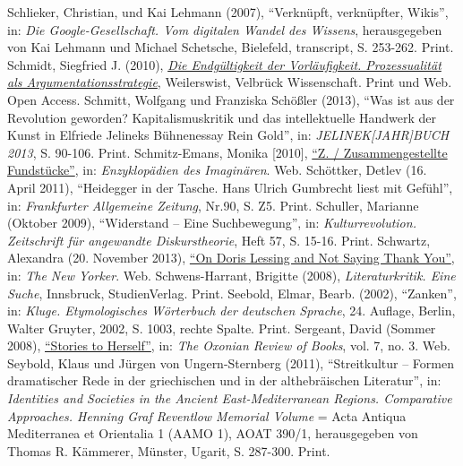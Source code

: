 \documentclass[fontsize=12pt]{scrartcl}
\begin{document}
{{{{\begin{thebibliography}
	Schlieker, Christian, und Kai Lehmann (2007), "`Verkn\"upft, verkn\"upfter, Wikis"', in: \textit{Die Google-Ge\-sell\-schaft. Vom digitalen Wandel des Wissens}, he\-rausgegeben von Kai Lehmann und Michael Schetsche, Bielefeld, transcript, S. 253-262. Print.
	Schmidt, Siegfried J. (2010), \href{http://edocs.fu-berlin.de/docs/receive/FUDOCS_document_000000010457}{\textit{Die Endg\"ultigkeit der Vorl\"aufigkeit. Prozessualit\"at als Argumentationsstrategie}}, Weilerswist, Velbr\"uck Wissenschaft. Print und Web. Open Access.
	Schmitt, Wolfgang und Franziska Sch\"o{\ss}ler (2013), "`Was ist aus der Revolution geworden? Kapitalismuskritik und das intellektuelle Handwerk der Kunst in Elfriede Jelineks B\"uhnenessay Rein Gold"', in: \textit{JELINEK[JAHR]\-BUCH 2013}, S. 90-106. Print.
	Schmitz-Emans, Monika [2010], \href{http://www.actalitterarum.de/theorie/mse/enz/enzz01.html}{"`Z. / Zusammengestellte Fundst\"ucke"'}, in: \textit{Enzy\-klop\"adien des Imagin\"aren}. Web.
	Sch\"ottker, Detlev (16. April 2011), "`Heidegger in der Tasche. Hans Ulrich Gumbrecht liest mit Gef\"uhl"', in: \textit{Frankfurter Allgemeine Zeitung}, Nr.90, S. Z5. Print.
	Schuller, Marianne (Oktober 2009), "`Widerstand -- Eine Suchbewegung"', in: \textit {Kulturrevolution. Zeitschrift f\"ur angewandte Diskurstheorie}, Heft 57, S. 15-16. Print.
	Schwartz, Alexandra (20. November 2013), \href{http://www.newyorker.com/books/page-turner/on-doris-lessing-and-not-saying-thank-you}{"`On Doris Lessing and Not Saying Thank You"'}, in: \textit{The New Yorker}. Web.
	Schwens-Harrant, Brigitte (2008), \textit{Literaturkritik. Eine Suche}, Innsbruck, StudienVerlag. Print.
	Seebold, Elmar, Bearb. (2002), "`Zanken"', in: \textit{Kluge. Etymologisches W\"orterbuch der deut\-schen Sprache}, 24. Auflage, Berlin, Walter Gruyter, 2002, S. 1003, rechte Spalte. Print.
	Sergeant, David (Sommer 2008), \href{http://www.oxonianreview.org/wp/stories-to-herself/}{"`Stories to Herself"'}, in: \textit{The Oxonian Review of Books}, vol. 7, no. 3. Web.
	Seybold, Klaus und J\"urgen von Ungern-Sternberg (2011), "`Streitkultur -- Formen dramatischer Rede in der griechischen und in der althebr\"aischen Li\-te\-ra\-tur"', in: \textit{Identities and Societies in the Ancient East-Mediterranean Regions. Comparative Approaches. Henning Graf Reventlow Memorial Volume} = Acta Antiqua Mediterranea et Orientalia 1 (AAMO 1), AOAT 390/1, he\-rausgegeben von Thomas R. K\"ammerer, M\"unster, Ugarit, S. 287-300. Print.

\end{thebibliography}}}}}
\end{document}

